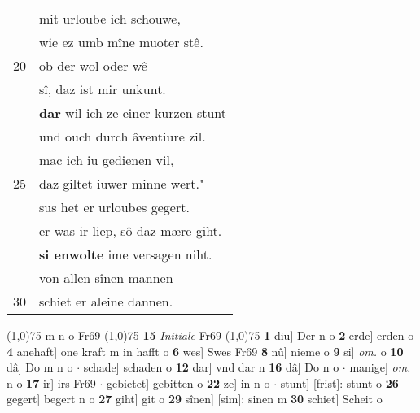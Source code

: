 \documentclass[8pt,a4paper,notitlepage]{article}
\begin{document}
\begin{table}[ht]
\begin{minipage}[t]{0.5\linewidth}
\begin{tabular}{rl}
 & mit urloube ich schouwe,\\ 
 & wie ez umb mîne muoter stê.\\ 
20 & ob der wol oder wê\\ 
 & sî, daz ist mir unkunt.\\ 
 & \textbf{dar} wil ich ze einer kurzen stunt\\ 
 & und ouch durch âventiure zil.\\ 
 & mac ich iu gedienen vil,\\ 
25 & daz giltet iuwer minne wert."\\ 
 & sus het er urloubes gegert.\\ 
 & er was ir liep, sô daz mære giht.\\ 
 & \textbf{si enwolte} ime versagen niht.\\ 
 & von allen sînen mannen\\ 
30 & schiet er aleine dannen.\\ 
\end{tabular}
\scriptsize
\line(1,0){75} \newline
m n o Fr69 \newline
\line(1,0){75} \newline
\textbf{15} \textit{Initiale} Fr69  \newline
\line(1,0){75} \newline
\textbf{1} diu] Der n o \textbf{2} erde] erden o \textbf{4} anehaft] one kraft m in hafft o \textbf{6} wes] Swes Fr69 \textbf{8} nû] nieme o \textbf{9} si] \textit{om.} o \textbf{10} dâ] Do m n o  $\cdot$ schade] schaden o \textbf{12} dar] vnd dar n \textbf{16} dâ] Do n o  $\cdot$ manige] \textit{om.} n o \textbf{17} ir] irs Fr69  $\cdot$ gebietet] gebitten o \textbf{22} ze] in n o  $\cdot$ stunt] [frist]: stunt o \textbf{26} gegert] begert n o \textbf{27} giht] git o \textbf{29} sînen] [sim]: sinen m \textbf{30} schiet] Scheit o \newline
\end{minipage}
\end{table}
\newpage
\end{document}
